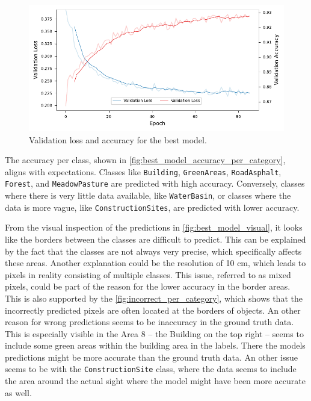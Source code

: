 \begin{figure}[H]
    \centering
    \captionsetup{width=0.8\linewidth}
    \includegraphics{figures/best_model_training_metrics.pdf}
    \caption{Validation loss and accuracy for the best model.}
    \label{fig:best_model_training_metrics}
\end{figure}

The accuracy per class, shown in \autoref{fig:best_model_accuracy_per_category},
aligns with expectations. Classes like \texttt{Building}, \texttt{GreenAreas}, \texttt{RoadAsphalt}, \texttt{Forest},
and \texttt{MeadowPasture} are predicted with high accuracy. Conversely, classes where there is
very little data available, like \texttt{WaterBasin}, or classes where the data is more vague,
like \texttt{ConstructionSites}, are predicted with lower accuracy.

From the visual inspection of the predictions in \autoref{fig:best_model_visual},
it looks like the borders between the classes are difficult to predict. This can be
explained by the fact that the classes are not always very precise, which specifically
affects these areas. Another explanation could be the resolution of 10 cm,
which leads to pixels in reality consisting of multiple classes. This issue, referred to
as mixed pixels, could be part of the reason for the lower accuracy in the
border areas. This is also supported by the \autoref{fig:incorrect_per_category},
which shows that the incorrectly predicted pixels are often located at the borders
of objects. An other reason for wrong predictions seems to be inaccuracy in the
ground truth data. This is especially visible in the Area 8 -- the Building on the
top right -- seems to include some green areas within the building area in the labels.
There the models predictions might be more accurate than the ground truth data.
An other issue seems to be with the \texttt{ConstructionSite} class, where the
data seems to include the area around the actual sight where the model might have been
more accurate as well.

